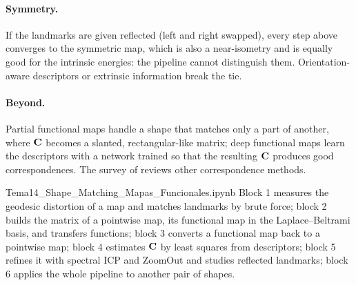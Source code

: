 

\paragraph{Symmetry.} If the landmarks are given reflected (left and right swapped), every step above
converges to the symmetric map, which is also a near-isometry and is equally good for the intrinsic
energies: the pipeline cannot distinguish them. Orientation-aware descriptors or extrinsic information
break the tie.

\paragraph{Beyond.} Partial functional maps \citep{Rodola2017} handle a shape that matches only a part of
another, where $\mathbf{C}$ becomes a slanted, rectangular-like matrix; deep functional maps
\citep{Litany2017} learn the descriptors with a network trained so that the resulting $\mathbf{C}$ produces good
correspondences. The survey of \citet{vanKaick2011} reviews other correspondence methods.

\begin{notebook}{Tema14\_Shape\_Matching\_Mapas\_Funcionales.ipynb}
Block 1 measures the geodesic distortion of a map and matches landmarks by brute force; block 2 builds
the matrix of a pointwise map, its functional map in the Laplace--Beltrami basis, and transfers
functions; block 3 converts a functional map back to a pointwise map; block 4 estimates $\mathbf{C}$ by least
squares from descriptors; block 5 refines it with spectral ICP and ZoomOut and studies reflected
landmarks; block 6 applies the whole pipeline to another pair of shapes.
\end{notebook}

